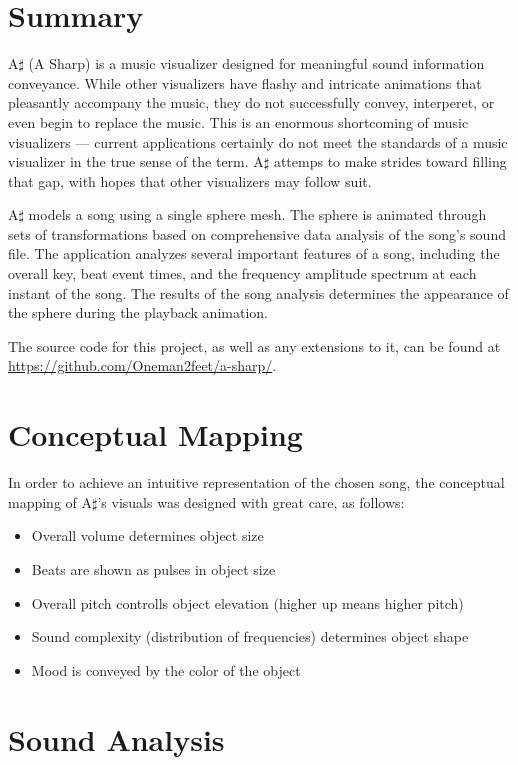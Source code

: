 \documentclass{article}
\begin{document}
\section{Summary}

A$\sharp$ (A Sharp) is a music visualizer designed for meaningful sound information conveyance. While other visualizers have flashy and intricate animations that pleasantly accompany the music, they do not successfully convey, interperet, or even begin to replace the music. This is an enormous shortcoming of music visualizers --- current applications certainly do not meet the standards of a music visualizer in the true sense of the term. A$\sharp$ attemps to make strides toward filling that gap, with hopes that other visualizers may follow suit.

A$\sharp$ models a song using a single sphere mesh. The sphere is animated through sets of transformations based on comprehensive data analysis of the song's sound file. The application analyzes several important features of a song, including the overall key, beat event times, and the frequency amplitude spectrum at each instant of the song. The results of the song analysis determines the appearance of the sphere during the playback animation.

The source code for this project, as well as any extensions to it, can be found at \url{https://github.com/Oneman2feet/a-sharp/}.

\section{Conceptual Mapping}

In order to achieve an intuitive representation of the chosen song, the conceptual mapping of A$\sharp$'s visuals was designed with great care, as follows:

\begin{itemize}
    \item Overall volume determines object size
    \item Beats are shown as pulses in object size
    \item Overall pitch controlls object elevation (higher up means higher pitch)
    \item Sound complexity (distribution of frequencies) determines object shape
    \item Mood is conveyed by the color of the object
\end{itemize}

\section{Sound Analysis}
\end{document}
